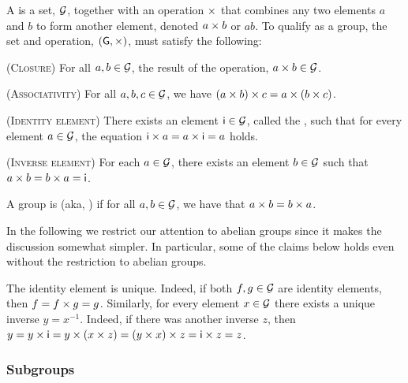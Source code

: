 \begin{defn}
    A  is a set, $\mathcal{G}$, together with an operation
    $\times$ that combines any two elements $a$ and $b$ to form another
    element, denoted $a \times b$ or $ab$. To qualify as a group, the
    set and operation, $(\mathsf{G}, \times)$, must satisfy the following:
    \smallskip%
    \begin{compactenumA}
        \item (\textsc{Closure}) For all $a, b \in \mathcal{G}$, the result
        of the operation, $a \times b \in \mathcal{G}$.

        \item (\textsc{Associativity}) For all $a, b, c \in \mathcal{G}$,
        we have $(a \times b) \times c = a \times (b \times c)$.

        \item (\textsc{Identity element}) There exists an
        element $\mathsf{i} \in \mathcal{G}$, called the ,
        such that for every element $a \in \mathcal{G}$, the equation $\mathsf{i}
        \times a = a \times \mathsf{i} = a$ holds.

        \item (\textsc{Inverse element}) For each $a \in \mathcal{G}$,
        there exists an element $b \in \mathcal{G}$ such that $a \times b = b
        \times a = \mathsf{i}$.
    \end{compactenumA}
    \smallskip%
    A group is  (aka, ) if for
    all $a,b \in \mathcal{G}$, we have that $a \times b = b \times a$.
\end{defn}

In the following we restrict our attention to abelian groups since it
makes the discussion somewhat simpler. In particular, some of the
claims below holds even without the restriction to abelian groups.

The identity element is unique. Indeed, if both $f, g \in \mathcal{G}$ are
identity elements, then $f = f \times g = g$. Similarly, for every
element $x \in \mathcal{G}$ there exists a unique inverse $y =
x^{-1}$. Indeed, if there was another inverse $z$, then $y = y \times
\mathsf{i} = y \times (x\times z) = (y\times x)\times z = \mathsf{i} \times z = z$.

\subsubsection{Subgroups}


